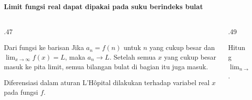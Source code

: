 \documentclass{../../kalkulus-ppt}
\begin{document}
\begin{frame}{\insertsection}
    \framesubtitle{Limit fungsi real dapat dipakai pada suku berindeks bulat}
    \begin{columns}[c,onlytextwidth]
        \begin{column}{.47\textwidth}
            \begin{block}{Dari fungsi ke barisan}
                Jika $a_n=f(n)$ untuk $n$ yang cukup besar
                dan $\lim_{x\to\infty}f(x)=L$, maka $a_n\to L$.
                Setelah semua $x$ yang cukup besar masuk ke
                pita limit, semua bilangan bulat di bagian itu juga masuk.
            \end{block}
            Diferensiasi dalam aturan L'Hôpital dilakukan
            terhadap variabel real $x$ pada fungsi $f$.
        \end{column}
        \begin{column}{.49\textwidth}
            \begin{contoh}
                Hitung $\displaystyle\lim_{n\to\infty}\frac{n^2}{e^n}$.
            \end{contoh}
        \end{column}
    \end{columns}
\end{frame}
\end{document}
